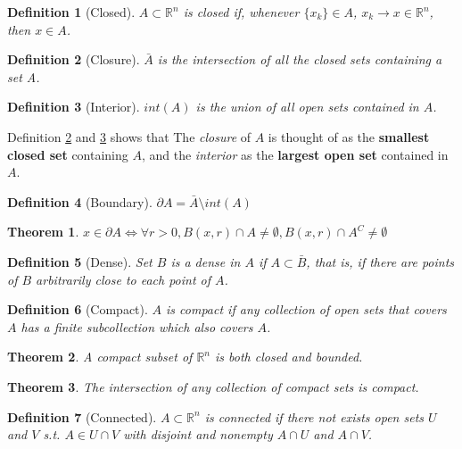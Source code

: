 \documentclass[12pt, a4paper]{article}
\newtheorem{definition}{Definition}[subsection]
\newtheorem{theorem}{Theorem}[subsection]
\begin{document}
\begin{definition}[Closed]
    $A \subset \mathbb{R}^n$ is closed if, whenever $\{x_k\}\in A$, $x_k\rightarrow x \in \mathbb{R}^n$, then $x\in A$.
\end{definition}

\begin{definition}[Closure]\label{closure}
    $\bar{A}$ is the intersection of all the closed sets containing a set A. 
\end{definition}

\begin{definition}[Interior]\label{interior}
    $int(A)$ is the union of all open sets contained in $A$.
\end{definition}

Definition \ref{closure} and \ref{interior} shows that The \textit{closure} 
of $A$ is thought of as the \textbf{smallest closed set} containing $A$, 
and the \textit{interior} as the \textbf{largest open set} contained in $A$.

\begin{definition}[Boundary]
    $\partial A = \bar{A}\setminus int(A)$
\end{definition}

\begin{theorem}
    $x\in\partial A \Leftrightarrow \forall r > 0, B(x, r) \cap A \neq \emptyset, B(x, r) \cap A^C \neq \emptyset$ 
\end{theorem}

\begin{definition}[Dense]
    Set $B$ is a dense in $A$ if $A\subset \bar{B}$, that is, if there are points of $B$ arbitrarily close to each point of $A$.
\end{definition}

\begin{definition}[Compact]
    $A$ is compact if any collection of open sets that covers $A$ has a finite subcollection which also covers $A$.
\end{definition}

\begin{theorem}
    A compact subset of $\mathbb{R}^n$ is both closed and bounded.
\end{theorem}

\begin{theorem}
    The intersection of any collection of compact sets is compact.
\end{theorem}

\begin{definition}[Connected]
    $A\subset \mathbb{R}^n$ is connected if there not exists open sets $U$ and $V$ s.t. $A\in U\cap V$ with disjoint and nonempty $A\cap U$ and $A\cap V$.
\end{definition}
\end{document}
